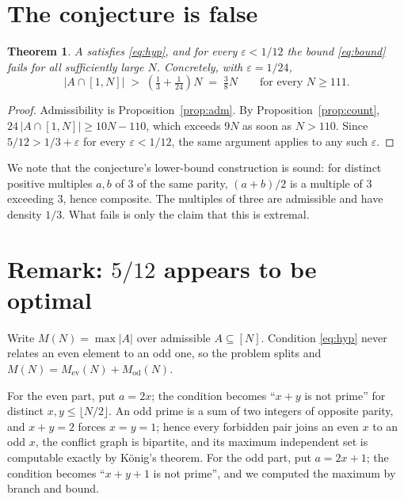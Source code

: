 \documentclass[11pt]{article}
\theoremstyle{plain}
\newtheorem{theorem}{Theorem}
\theoremstyle{definition}
\theoremstyle{remark}
\begin{document}
\section{The conjecture is false}

\begin{theorem}
$A$ satisfies \eqref{eq:hyp}, and for every $\varepsilon<1/12$ the bound
\eqref{eq:bound} fails for all sufficiently large $N$. Concretely, with
$\varepsilon=1/24$,
\[
  |A\cap[1,N]| \;>\; \left(\tfrac13+\tfrac1{24}\right)N \;=\;\tfrac38 N
  \qquad\text{for every } N\ge111 .
\]
\end{theorem}

\begin{proof}
Admissibility is Proposition~\ref{prop:adm}. By
Proposition~\ref{prop:count}, $24\,|A\cap[1,N]|\ge 10N-110$, which exceeds
$9N$ as soon as $N>110$. Since $5/12>1/3+\varepsilon$ for every
$\varepsilon<1/12$, the same argument applies to any such $\varepsilon$.
\end{proof}

We note that the conjecture's lower-bound construction is sound: for distinct
positive multiples $a,b$ of $3$ of the same parity, $(a+b)/2$ is a multiple of
$3$ exceeding $3$, hence composite. The multiples of three are admissible and
have density $1/3$. What fails is only the claim that this is extremal.

\section{Remark: \texorpdfstring{$5/12$}{5/12} appears to be optimal}

Write $M(N)=\max|A|$ over admissible $A\subseteq[N]$. Condition
\eqref{eq:hyp} never relates an even element to an odd one, so the problem
splits and $M(N)=M_{\mathrm{ev}}(N)+M_{\mathrm{od}}(N)$.

For the even part, put $a=2x$; the condition becomes ``$x+y$ is not prime''
for distinct $x,y\le\lfloor N/2\rfloor$. An odd prime is a sum of two integers
of opposite parity, and $x+y=2$ forces $x=y=1$; hence every forbidden pair
joins an even $x$ to an odd $x$, the conflict graph is bipartite, and its
maximum independent set is computable exactly by K\"onig's theorem. For the
odd part, put $a=2x+1$; the condition becomes ``$x+y+1$ is not prime'', and we
computed the maximum by branch and bound.
\end{document}
